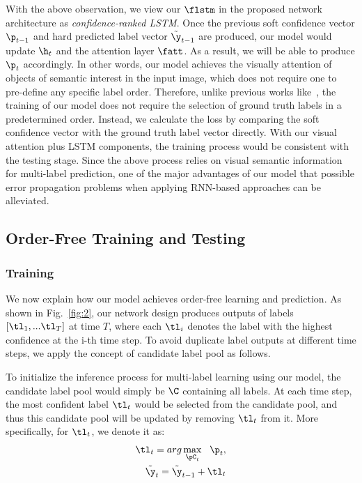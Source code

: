 \documentclass[letterpaper]{article} %
\begin{document}
With the above observation, we view our $\flstm$ in the proposed network architecture as \emph{confidence-ranked LSTM}. Once the previous soft confidence vector $\p_{t-1}$ and hard predicted label vector $\tilde{\y}_{t-1}$ are produced, our model would update $\h_t$ and the attention layer $\fatt$. As a result, we will be able to produce $\p_{t}$ accordingly. In other words, our model achieves the visually attention of objects of semantic interest in the input image, which does not require one to pre-define any specific label order. Therefore, unlike previous works like~\cite{wang2016cnn}, the training of our model does not require the selection of ground truth labels in a predetermined order. Instead, we calculate the loss by comparing the soft confidence vector with the ground truth label vector directly. With our visual attention plus LSTM components, the training process would be consistent with the testing stage. Since the above process relies on visual semantic information for multi-label prediction, one of the major advantages of our model that possible error propagation problems when applying RNN-based approaches can be alleviated.

\subsection{Order-Free Training and Testing}
\subsubsection{Training}

We now explain how our model achieves order-free learning and prediction. As shown in Fig.~\ref{fig:2}, our network design produces outputs of labels ${[\tl_1, ... \tl_T]}$ at time $T$, where each $\tl_i$ denotes the label with the highest confidence at the i-th time step. To avoid duplicate label outputs at different time steps, we apply the concept of candidate label pool as follows.

To initialize the inference process for multi-label learning using our model, the candidate label pool would simply be $\C$ containing all labels. At each time step, the most confident label $\tl_t$ would be selected from the candidate pool, and thus this candidate pool will be updated by removing $\tl_t$ from it. More specifically, for $\tl_t$, we denote it as:
\begin{equation}
\label{eq:max}
\begin{aligned}
\tl_t = arg\max_{\pC_t}~~\p_t, \\
\tilde{\y}_t = \tilde{\y}_{t-1} + \tl_t
\end{aligned}
\end{equation}
\end{document}
